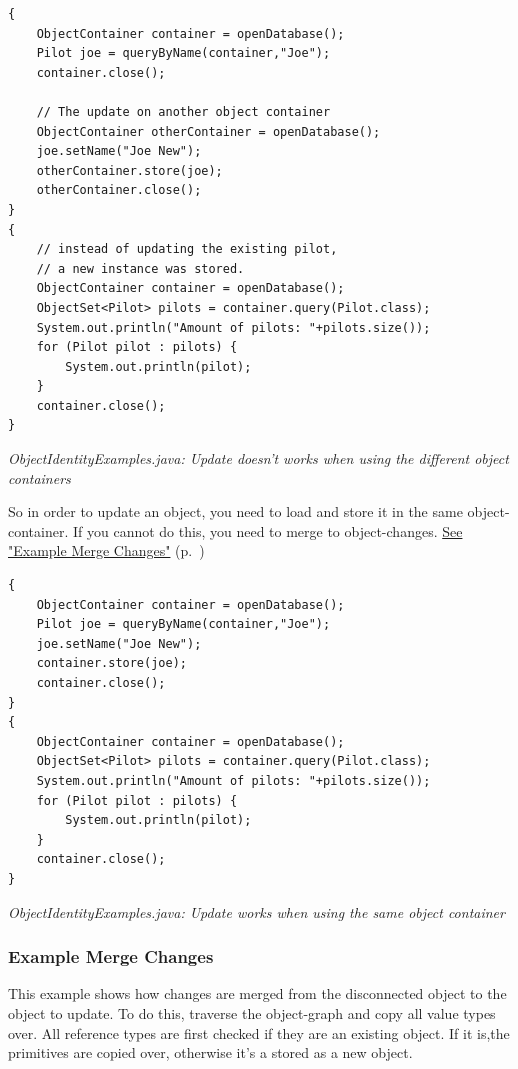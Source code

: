 \begin{lstlisting}
{
    ObjectContainer container = openDatabase();
    Pilot joe = queryByName(container,"Joe");
    container.close();

    // The update on another object container
    ObjectContainer otherContainer = openDatabase();
    joe.setName("Joe New");
    otherContainer.store(joe);
    otherContainer.close();
}
{
    // instead of updating the existing pilot,
    // a new instance was stored.
    ObjectContainer container = openDatabase();
    ObjectSet<Pilot> pilots = container.query(Pilot.class);
    System.out.println("Amount of pilots: "+pilots.size());
    for (Pilot pilot : pilots) {
        System.out.println(pilot);
    }
    container.close();
}
\end{lstlisting}

{\small\itshape ObjectIdentityExamples.java: Update doesn't works when using the different object containers\par}
\medskip

So in order to update an object, you need to load and store it in the same object-container. If you cannot do this, you need to merge to object-changes. \hyperref[ref:platform-specific-issues-disconnected-objects-example-merge-changes]{See "Example Merge Changes"} (p.~\pageref{ref:platform-specific-issues-disconnected-objects-example-merge-changes})

\begin{lstlisting}
{
    ObjectContainer container = openDatabase();
    Pilot joe = queryByName(container,"Joe");
    joe.setName("Joe New");
    container.store(joe);
    container.close();
}
{
    ObjectContainer container = openDatabase();
    ObjectSet<Pilot> pilots = container.query(Pilot.class);
    System.out.println("Amount of pilots: "+pilots.size());
    for (Pilot pilot : pilots) {
        System.out.println(pilot);
    }
    container.close();
}
\end{lstlisting}

{\small\itshape ObjectIdentityExamples.java: Update works when using the same object container\par}
\medskip

\subsubsection{Example Merge Changes}
\label{ref:platform-specific-issues-disconnected-objects-example-merge-changes}

This example shows how changes are merged from the disconnected object to the object to update. To do this, traverse the object-graph and copy all value types over. All reference types are first checked if they are an existing object. If it is,the primitives are copied over, otherwise it's a stored as a new object.

